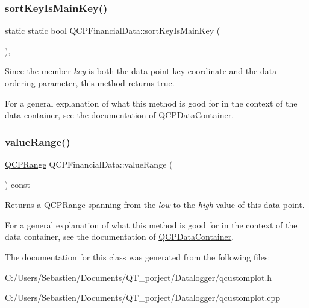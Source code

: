 \subsubsection{\texorpdfstring{sort\+Key\+Is\+Main\+Key()}{sortKeyIsMainKey()}}
{\footnotesize\ttfamily static static bool Q\+C\+P\+Financial\+Data\+::sort\+Key\+Is\+Main\+Key (\begin{DoxyParamCaption}{ }\end{DoxyParamCaption})\hspace{0.3cm}{\ttfamily [inline]}, {\ttfamily [static]}}

Since the member {\itshape key} is both the data point key coordinate and the data ordering parameter, this method returns true.

For a general explanation of what this method is good for in the context of the data container, see the documentation of \hyperlink{class_q_c_p_data_container}{Q\+C\+P\+Data\+Container}. \mbox{\label{class_q_c_p_financial_data_a164d5584eeeb9ba48b4b595ac2ac7fcf}} 
\subsubsection{\texorpdfstring{value\+Range()}{valueRange()}}
{\footnotesize\ttfamily \hyperlink{class_q_c_p_range}{Q\+C\+P\+Range} Q\+C\+P\+Financial\+Data\+::value\+Range (\begin{DoxyParamCaption}{ }\end{DoxyParamCaption}) const\hspace{0.3cm}{\ttfamily [inline]}}

Returns a \hyperlink{class_q_c_p_range}{Q\+C\+P\+Range} spanning from the {\itshape low} to the {\itshape high} value of this data point.

For a general explanation of what this method is good for in the context of the data container, see the documentation of \hyperlink{class_q_c_p_data_container}{Q\+C\+P\+Data\+Container}. 

The documentation for this class was generated from the following files\+:\begin{DoxyCompactItemize}
\item 
C\+:/\+Users/\+Sebastien/\+Documents/\+Q\+T\+\_\+porject/\+Datalogger/qcustomplot.\+h\item 
C\+:/\+Users/\+Sebastien/\+Documents/\+Q\+T\+\_\+porject/\+Datalogger/qcustomplot.\+cpp\end{DoxyCompactItemize}
